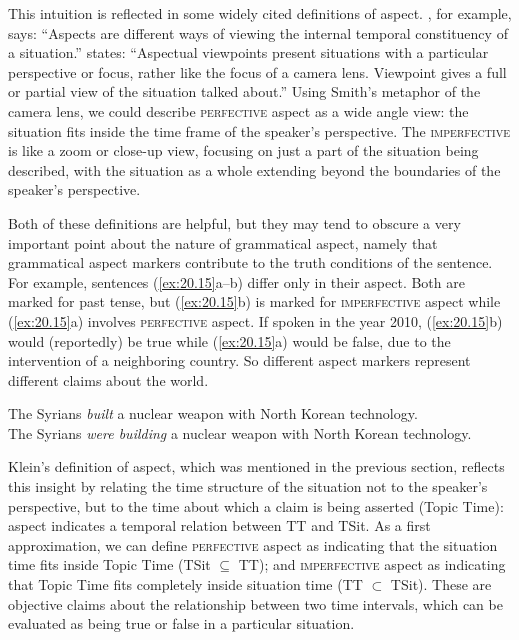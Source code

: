 This intuition is reflected in some widely cited definitions of aspect. \citet[3]{Comrie1976}, for example, says: “Aspects are different ways of viewing the internal temporal constituency of a situation.” \citet[2--3]{Smith1997} states: “Aspectual viewpoints present situations with a particular perspective or focus, rather like the focus of a camera lens. Viewpoint gives a full or partial view of the situation talked about.” Using Smith’s metaphor of the camera lens, we could describe \textsc{perfective} aspect as a wide angle view: the situation fits inside the time frame of the speaker’s perspective. The \textsc{imperfective} is like a zoom or close-up view, focusing on just a part of the situation being described, with the situation as a whole extending beyond the boundaries of the speaker’s perspective.



Both of these definitions are helpful, but they may tend to obscure a very important point about the nature of grammatical aspect, namely that grammatical aspect markers contribute to the truth conditions of the sentence. For example, sentences (\ref{ex:20.15}a--b) differ only in their aspect. Both are marked for past tense, but (\ref{ex:20.15}b) is marked for \textsc{imperfective} aspect while (\ref{ex:20.15}a) involves \textsc{perfective} aspect. If spoken in the year 2010, (\ref{ex:20.15}b) would (reportedly) be true while (\ref{ex:20.15}a) would be false, due to the intervention of a neighboring country. So different aspect markers represent different claims about the world.


\ea \label{ex:20.15}
\ea  The Syrians \textit{built} a nuclear weapon with North {Korean} technology.\\
\ex The Syrians \textit{were building} a nuclear weapon with North {Korean} technology.
                       \z
\z


Klein’s definition of aspect, which was mentioned in the previous section, reflects this insight by relating the time structure of the situation not to the speaker’s perspective, but to the time about which a claim is being asserted (Topic Time): aspect indicates a temporal relation between TT and TSit. As a first approximation, we can define \textsc{perfective} aspect as indicating that the situation time fits inside Topic Time (TSit ${\subseteq}$ TT); and \textsc{imperfective} aspect as indicating that Topic Time fits completely inside situation time (TT ${\subset}$ TSit). These are objective claims about the relationship between two time intervals, which can be evaluated as being true or false in a particular situation.



